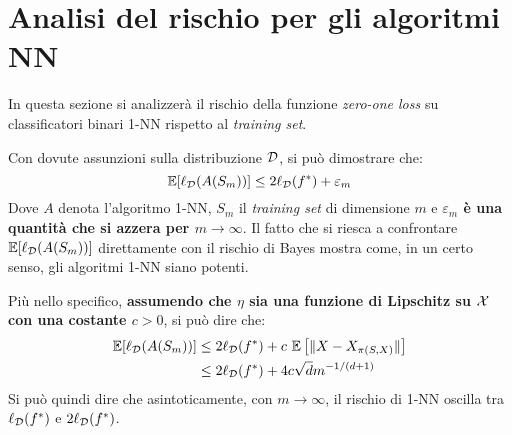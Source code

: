 \section{Analisi del rischio per gli algoritmi \texorpdfstring{NN}{NN}}

In questa sezione si analizzerà il rischio della funzione \textit{zero-one loss}
su classificatori binari 1-NN rispetto al \textit{training set}. 

Con dovute assunzioni sulla distribuzione $\mathcal{D}$, si può dimostrare che:
$$ \mathbb{E}[\ell_{\mathcal{D}}(A(S_m))] \leq 2\ell_{\mathcal{D}}(f^*)+\varepsilon_m $$
Dove $A$ denota l'algoritmo 1-NN, $S_m$ il \textit{training set} di dimensione
$m$ e \textbf{$\varepsilon_m$ è una quantità che si azzera per 
$m\rightarrow\infty$}. Il fatto che si riesca a confrontare $\mathbb{E}[\ell_{\mathcal{D}}(A(S_m))]$
direttamente con il rischio di Bayes mostra come, in un certo senso, gli 
algoritmi 1-NN siano potenti.

Più nello specifico, \textbf{assumendo che $\eta$ sia una funzione di Lipschitz
su $\mathcal{X}$ con una costante $c>0$},
si può dire che:
\begin{align}
    \mathbb{E}[\ell_{\mathcal{D}}(A(S_m))] &\leq
        2\ell_{\mathcal{D}}(f^*)+c_{\phantom{i}}\mathbb{E}\left[\|X-X_{\pi(S,X)}\|\right]\notag\\
        &\leq 2\ell_{\mathcal{D}}(f^*)+4c\sqrt{d}m^{-1/(d+1)}\notag
\end{align}
Si può quindi dire che asintoticamente, con $m\rightarrow\infty$, il rischio di
1-NN oscilla tra $\ell_{\mathcal{D}}(f^*)$ e $2\ell_{\mathcal{D}}(f^*)$.
